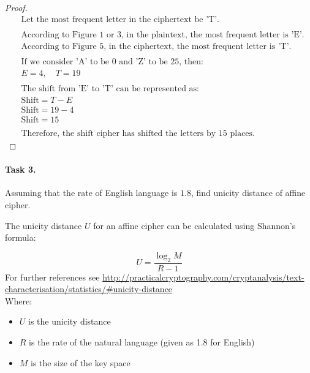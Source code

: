 \documentclass{article}
\begin{document}
\begin{enumerate}
\begin{minipage}{\linewidth}
\begin{proof}
\begin{align*}
              &\text{Let the most frequent letter in the ciphertext be 'T'.} \\
              & \\
              &\text{According to Figure 1 or 3, in the plaintext, the most frequent letter is 'E'.} \\
              &\text{According to Figure 5, in the ciphertext, the most frequent letter is 'T'.} \\
              & \\
              &\text{If we consider 'A' to be 0 and 'Z' to be 25, then:} \\
              &E = 4, \quad T = 19 \\
              & \\
              &\text{The shift from 'E' to 'T' can be represented as:} \\
              &\text{Shift} = T - E \\
              &\text{Shift} = 19 - 4 \\
              &\text{Shift} = 15 \\
              & \\
              &\text{Therefore, the shift cipher has shifted the letters by 15 places.}
            \end{align*}
          \end{proof}
    \end{minipage}
\end{enumerate}


\paragraph{Task 3.} Assuming that the rate of English language is $1.8$, find unicity distance of affine cipher.


The unicity distance \( U \) for an affine cipher can be calculated using Shannon's formula:

\[
  U = \frac{\log_2 M}{R - 1}
\]
For further references see \href{http://practicalcryptography.com/cryptanalysis/text-characterisation/statistics/#unicity-distance}{http://practicalcryptography.com/cryptanalysis/text-characterisation/statistics/#unicity-distance}\\

Where:
\begin{itemize}
  \item \( U \) is the unicity distance
  \item \( R \) is the rate of the natural language (given as 1.8 for English)
  \item \( M \) is the size of the key space
\end{itemize}
\end{document}

